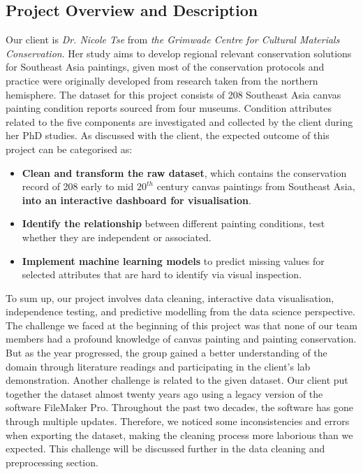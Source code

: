 \documentclass[11pt, oneside]{article}
\begin{document}
\subsection{Project Overview and Description}
Our client is \textit{Dr. Nicole Tse} from \textit{the Grimwade Centre for Cultural Materials Conservation}. Her study aims to develop regional relevant conservation solutions for Southeast Asia paintings, given most of the conservation protocols and practice were originally developed from research taken from the northern hemisphere. The dataset for this project consists of 208 Southeast Asia canvas painting condition reports sourced from four museums. Condition attributes related to the five components are investigated and collected by the client during her PhD studies. As discussed with the client, the expected outcome of this project can be categorised as:
\begin{itemize}
    \item \textbf{Clean and transform the raw dataset}, which contains the conservation record of 208 early to mid $20^{th}$ century canvas paintings from Southeast Asia, \textbf{into an interactive dashboard for visualisation}.
    \item \textbf{Identify the relationship} between different painting conditions, test whether they are independent or associated.
    \item \textbf{Implement machine learning models} to predict missing values for selected attributes that are hard to identify via visual inspection.
\end{itemize}
To sum up, our project involves data cleaning, interactive data visualisation, independence testing, and predictive modelling from the data science perspective. The challenge we faced at the beginning of this project was that none of our team members had a profound knowledge of canvas painting and painting conservation. But as the year progressed, the group gained a better understanding of the domain through literature readings and participating in the client's lab demonstration. 
\bigbreak
\noindent Another challenge is related to the given dataset. Our client put together the dataset almost twenty years ago using a legacy version of the software FileMaker Pro. Throughout the past two decades, the software has gone through multiple updates. Therefore, we noticed some inconsistencies and errors when exporting the dataset, making the cleaning process more laborious than we expected. This challenge will be discussed further in the data cleaning and preprocessing section.
\end{document}
